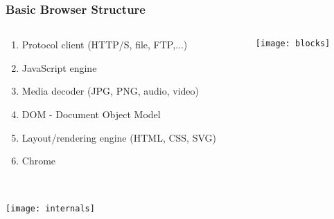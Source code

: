\documentclass[
	notes=none,
	aspectratio=169
]{beamer}
\begin{document}
\begin{frame}
\frametitle{Basic Browser Structure}

\begin{columns}[T]
\begin{column}[T]{0.66\textwidth}
\setlength{\parskip}{0.5em}

\vspace{1.5cm}
\begin{enumerate}
\setlength{\parskip}{0.5em}
\item Protocol client (HTTP/S, file, FTP,...)
\item JavaScript engine
\item Media decoder (JPG, PNG, audio, video)
\item DOM - Document Object Model
\item Layout/rendering engine (HTML, CSS, SVG)
\item Chrome
\end{enumerate}

\end{column}
\begin{column}[T]{0.34\textwidth}
\setlength{\parskip}{0.5em}

\vspace{-0.2cm}
\texttt{[image: blocks]}

\end{column}
\end{columns}

\end{frame}
\note{
\begin{enumerate}
\item -
\end{enumerate}
}


\begin{frame}
\frametitle{}

\begin{columns}[T]
\begin{column}[T]{1.0\textwidth}

\vspace{0.2cm}
\texttt{[image: internals]}

\end{column}
\end{columns}

\end{frame}
\end{document}
